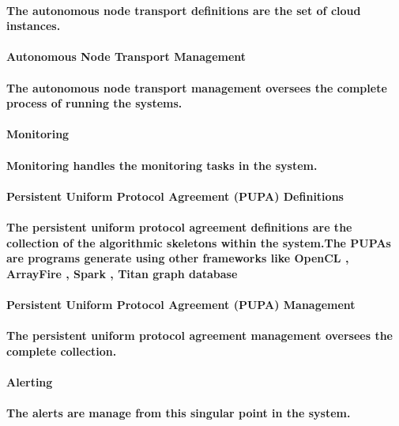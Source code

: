 \documentclass{acm_proc_article-sp}
\begin{document}
\paragraph{The autonomous node transport definitions are the set of cloud instances.}
\paragraph{\textbf{Autonomous Node Transport Management}}
\paragraph{The autonomous node transport management oversees the complete process of running the systems.}
\paragraph{\textbf{Monitoring}}
\paragraph{Monitoring handles the monitoring tasks in the system.}
\paragraph{\textbf{Persistent Uniform Protocol Agreement (PUPA) Definitions}}
\paragraph{The persistent uniform protocol agreement definitions are the collection of the algorithmic skeletons within the system.The PUPAs are programs generate using other frameworks like OpenCL \cite{stone2010opencl}, ArrayFire \cite{malcolm2012arrayfire}, Spark \cite{hintjens2011omq}, Titan graph database \cite{tanase2014highly} \cite{mishra2014titan}}
\paragraph{\textbf{Persistent Uniform Protocol Agreement (PUPA) Management}}
\paragraph{The persistent uniform protocol agreement management oversees the complete collection.}
\paragraph{\textbf{Alerting}}
\paragraph{The alerts are manage from this singular point in the system.}
\end{document}
